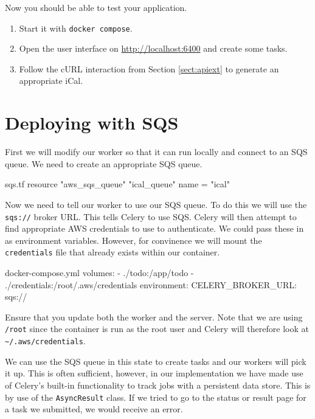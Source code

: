 \documentclass{csse4400}
\begin{document}
Now you should be able to test your application.
\begin{enumerate}
    \item Start it with \texttt{docker compose}.
    \item Open the user interface on \url{http://localhost:6400} and create some tasks.
    \item Follow the cURL interaction from Section \ref{sect:apiext} to generate an appropriate iCal.
\end{enumerate}


\section{Deploying with SQS}

First we will modify our worker so that it can run locally and connect to an SQS queue.
We need to create an appropriate SQS queue.

\begin{code}[language=terraform,numbers=none]{sqs.tf}
resource "aws_sqs_queue" "ical_queue" {
    name = "ical"
}
\end{code}


Now we need to tell our worker to use our SQS queue.
To do this we will use the \texttt{sqs://} broker URL.
This tells Celery to use SQS.
Celery will then attempt to find appropriate AWS credentials to use to authenticate.
We could pass these in as environment variables.
However, for convinence we will mount the \texttt{credentials} file that already exists within our container.

\begin{code}[numbers=none]{docker-compose.yml}
volumes:
  - ./todo:/app/todo
  - ./credentials:/root/.aws/credentials
environment:
  CELERY_BROKER_URL: sqs://
\end{code}

Ensure that you update both the worker and the server.
Note that we are using \texttt{/root} since the container is run as the root user and Celery will therefore look at \texttt{\textasciitilde/.aws/credentials}.

We can use the SQS queue in this state to create tasks and our workers will pick it up.
This is often sufficient,
however, in our implementation we have made use of Celery's built-in functionality to track jobs with a persistent data store.
This is by use of the \texttt{AsyncResult} class.
If we tried to go to the status or result page for a task we submitted, we would receive an error.
\end{document}
